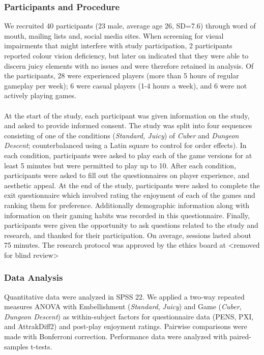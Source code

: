 \documentclass{sigchi}
\begin{document}
\subsubsection{Participants and Procedure}
We recruited 40 participants (23 male, average age 26, SD=7.6) through word of mouth, mailing lists and, social media sites. When screening for visual impairments that might interfere with study participation, 2 participants reported colour vision deficiency, but later on indicated that they were able to discern juicy elements with no issues and were therefore retained in analysis. Of the participants, 28 were experienced players (more than 5 hours of regular gameplay per week); 6 were casual players (1-4 hours a week), and 6 were not actively playing games. 
\\\\
At the start of the study, each participant was given information on the study, and asked to provide informed consent. 
The study was split into four sequences consisting of one of the conditions (\textit{Standard, Juicy}) of \textit{Cuber} and \textit{Dungeon Descent}; counterbalanced using a Latin square to control for order effects). In each condition, participants were asked to play each of the game versions for at least 5 minutes but were permitted to play up to 10. After each condition, participants were asked to fill out the questionnaires on player experience, and aesthetic appeal. At the end of the study, participants were asked to complete the exit questionnaire which involved rating the enjoyment of each of the games and ranking them for preference. Additionally demographic information along with information on their gaming habits was recorded in this questionnaire. Finally, participants were given the opportunity to ask questions related to the study and research, and thanked for their participation. On average, sessions lasted about 75 minutes. The research protocol was approved by the ethics board at <removed for blind review>
\subsubsection{Data Analysis}
Quantitative data were analyzed in SPSS 22. We applied a two-way repeated measures ANOVA with Embellishment (\textit{Standard}, \textit{Juicy}) and Game (\textit{Cuber}, \textit{Dungeon Descent}) as within-subject factors for questionnaire data (PENS, PXI, and AttrakDiff2) and post-play enjoyment ratings. Pairwise comparisons were made with Bonferroni correction. Performance data were analyzed with paired-samples t-tests.
\end{document}
